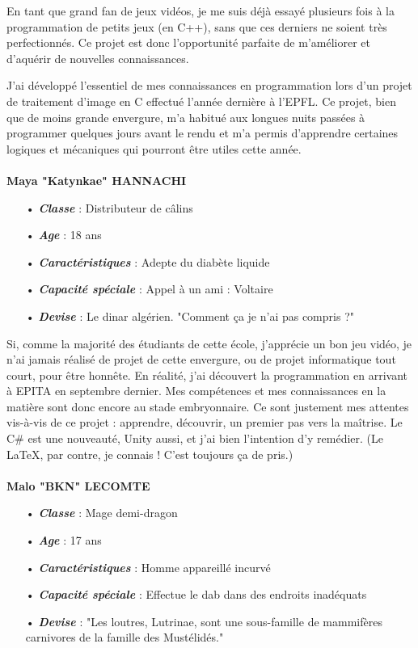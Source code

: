 \documentclass{article}
\begin{document}
En tant que grand fan de jeux vidéos, je me suis déjà essayé plusieurs fois à la programmation de petits jeux (en C++), sans que ces derniers ne soient très perfectionnés. Ce projet est donc l'opportunité parfaite de m'améliorer et d'aquérir de nouvelles connaissances.

J'ai développé l'essentiel de mes connaissances en programmation lors d'un projet  de traitement d'image en C effectué l'année dernière à l'EPFL. Ce projet, bien que de moins grande envergure, m'a habitué aux longues nuits passées à programmer quelques jours avant le rendu et m'a permis d'apprendre certaines logiques et mécaniques qui pourront être utiles cette année.\\
\\
\vspace{0.3cm}
\textbf{Maya "Katynkae" HANNACHI}
\begin{itemize}
\item[•] \textbf{\textit{Classe}} : Distributeur de câlins
\item[•] \textbf{\textit{Age}} : 18 ans
\item[•] \textbf{\textit{Caractéristiques}} : Adepte du diabète liquide 
\item[•] \textbf{\textit{Capacité spéciale}} : Appel à un ami : Voltaire
\item[•] \textbf{\textit{Devise}} : Le dinar algérien. "Comment ça je n'ai pas compris ?"
\end{itemize}

Si, comme la majorité des étudiants de cette école, j'apprécie un bon jeu vidéo, je n'ai jamais réalisé de projet de cette envergure, ou de projet informatique tout court, pour être honnête. 
En réalité, j'ai découvert la programmation en arrivant à EPITA en septembre dernier. Mes compétences et mes connaissances en la matière sont donc encore au stade embryonnaire.
Ce sont justement mes attentes vis-à-vis de ce projet : apprendre, découvrir, un premier pas vers la maîtrise. Le C\# est une nouveauté, Unity aussi, et j'ai bien l'intention d'y remédier.
(Le LaTeX, par contre, je connais ! C'est toujours ça de pris.)\\
\\
\vspace{0.3cm}
\textbf{Malo "BKN" LECOMTE}
\begin{itemize}
\item[•] \textbf{\textit{Classe}} : Mage demi-dragon
\item[•] \textbf{\textit{Age}} : 17 ans
\item[•] \textbf{\textit{Caractéristiques}} : Homme appareillé incurvé
\item[•] \textbf{\textit{Capacité spéciale}} : Effectue le dab dans des endroits inadéquats
\item[•] \textbf{\textit{Devise}} : "Les loutres, Lutrinae, sont une sous-famille de mammifères carnivores de la famille des Mustélidés."
\end{itemize}
\end{document}
